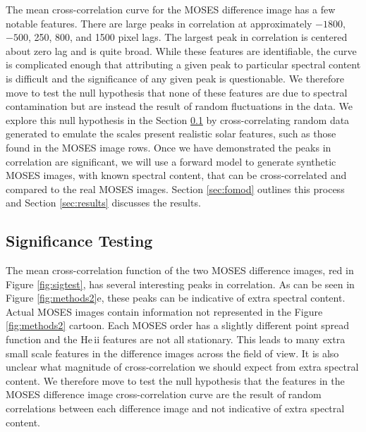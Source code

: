 	 
		 The mean cross-correlation curve for the MOSES difference image has a few notable features.  
		 There are large peaks in correlation  at approximately $-1800$, $-500$, 250, 800, and 1500 pixel lags.  
		 The largest peak in correlation is centered about zero lag and is quite broad.   
		 While these features are identifiable, the curve is complicated enough that attributing a given peak to particular spectral content is difficult and the significance of any given peak is questionable. 
		 We therefore move to test the null hypothesis that none of these features are due to spectral contamination but are instead the result of random fluctuations in the data. 
		 We explore this null hypothesis in the Section \ref{sec:sigtesting} by cross-correlating random data generated to emulate the scales present realistic solar features, such as those found in the MOSES image rows.
		 Once we have demonstrated the peaks in correlation are significant, we will use a forward model to generate synthetic MOSES images, with known spectral content, that can be cross-correlated and compared to the real MOSES images.
		 Section \ref{sec:fomod} outlines this process and Section \ref{sec:results} discusses the results.
 
	
	\subsection{Significance Testing}\label{sec:sigtesting}
	
		The mean cross-correlation function of the two MOSES difference images, red in Figure \ref{fig:sigtest}, has several interesting peaks in correlation.  
		As can be seen in Figure \ref{fig:methods2}e, these peaks can be indicative of extra spectral content.  
		Actual MOSES images contain information not represented in the Figure \ref{fig:methods2} cartoon.  
		Each MOSES order has a slightly different point spread function and the He\,{\sc ii} features are not all stationary.  
		This leads to many extra small scale features in the difference images across the field of view.  
		It is also unclear what magnitude of cross-correlation we should expect from extra spectral content.  
		We therefore move to test the null hypothesis that the features in the MOSES difference image cross-correlation curve are the result of random correlations between each difference image and not indicative of extra spectral content.  
		
